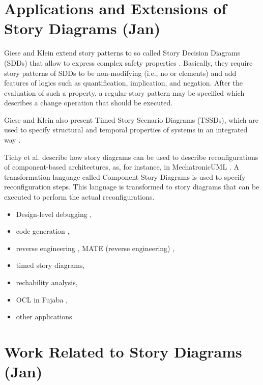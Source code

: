 





\section{Applications and Extensions of Story Diagrams (Jan)}
Giese and Klein extend story patterns to so called Story Decision Diagrams (SDDs) that allow to express complex safety properties \cite{GK06a}.
Basically, they require story patterns of SDDs to be non-modifying (i.e., no \create or \destroy elements) and add features of logics such as quantification, implication, and negation.
After the evaluation of such a property, a regular story pattern may be specified which describes a change operation that should be executed.

Giese and Klein also present Timed Story Scenario Diagrams (TSSDs), which are used to specify structural and temporal properties of systems in an integrated way \cite{KG07a}.

Tichy et al. \cite{THH+08} describe how story diagrams can be used to describe reconfigurations of component-based architectures, as, for instance, in MechatronicUML \cite{EBD+12}.
A transformation language called Component Story Diagrams is used to specify reconfiguration steps.
This language is transformed to story diagrams that can be executed to perform the actual reconfigurations.

\begin{itemize}
\item Design-level debugging \cite{GZ02,Gei02,GZ06},
\item code generation \cite{GSR05,GBD07},
\item reverse engineering \cite{NSW+02,BGS+Z08}, MATE (reverse engineering) \cite{SKS+07,ST08},
\item timed story diagrams,
\item rechability analysis,
\item OCL in Fujaba \cite{SZG07},
\item other applications \cite{KNNZ00,GZ10}
\end{itemize}


\section{Work Related to Story Diagrams (Jan)}

